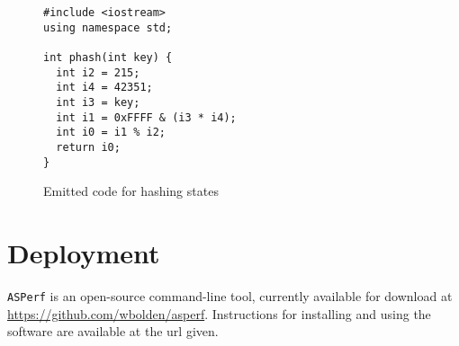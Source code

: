 \documentclass{article}
\begin{document}
\begin{figure}[H]
\begin{lstlisting}
#include <iostream>
using namespace std;

int phash(int key) {
  int i2 = 215;
  int i4 = 42351;
  int i3 = key;
  int i1 = 0xFFFF & (i3 * i4);
  int i0 = i1 % i2;
  return i0;
}
\end{lstlisting}
\caption{Emitted code for hashing states}\label{visina8}
\end{figure}


\section{Deployment}

\texttt{ASPerf} is an open-source command-line tool, currently available for download at \href{https://github.com/wbolden/asperf}{https://github.com/wbolden/asperf}. Instructions for installing and using the software are available at the url given.
\end{document}
